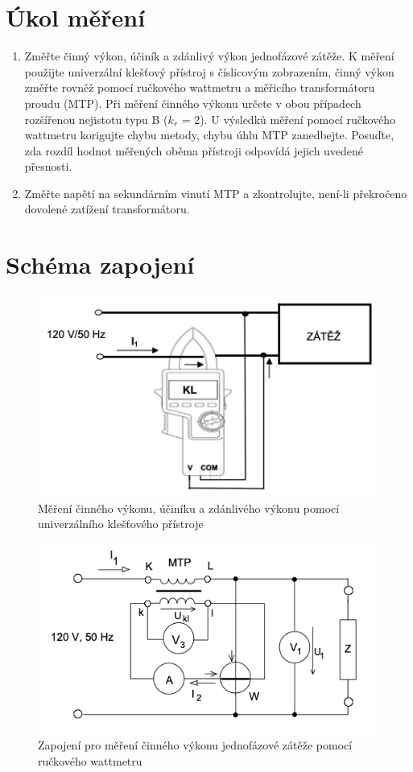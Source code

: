 \documentclass[a4paper,12pt]{article}   %
\begin{document}
\section{Úkol měření}
\label{chap:zadani}
\begin{enumerate}
  \item  Změřte činný výkon, účiník a zdánlivý výkon jednofázové zátěže. K měření použijte univerzální klešťový přístroj s číslicovým zobrazením, činný výkon změřte rovněž pomocí ručkového wattmetru a měřicího transformátoru proudu (MTP). Při měření činného výkonu určete v obou případech rozšířenou nejistotu typu B ($k_r$ = 2). U výsledků měření pomocí ručkového wattmetru korigujte chybu metody, chybu úhlu MTP zanedbejte. Posuďte, zda rozdíl hodnot měřených oběma přístroji odpovídá jejich uvedené přesnosti.
  \item  Změřte napětí na sekundárním vinutí MTP a zkontrolujte, není-li překročeno dovolené zatížení transformátoru.
\end{enumerate}



\section{Schéma zapojení}
\label{schema_zapojeni}
\begin{figure}[h!]
  \centering
  \includegraphics[width=.6\textwidth]{kestewatt.png}
  \caption{Měření činného výkonu, účiníku a zdánlivého výkonu pomocí univerzálního klešťového přístroje}
  \label{fig:klestewatt}
\end{figure}

\begin{figure}[h!]
  \centering
  \includegraphics[width=.6\textwidth]{rucwatt.png}
  \caption{Zapojení pro měření činného výkonu jednofázové zátěže pomocí ručkového wattmetru}
  \label{fig:rucwatt}
\end{figure}
\end{document}
